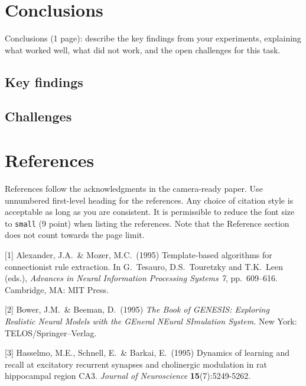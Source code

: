 \documentclass{article}
\begin{document}
\section{Conclusions}
\label{others}
Conclusions (1 page): describe the key findings from your experiments, explaining what worked
well, what did not work, and the open challenges for this task.
\subsection{Key findings}
\subsection{Challenges}


\section*{References}


References follow the acknowledgments in the camera-ready paper. Use unnumbered first-level heading for
the references. Any choice of citation style is acceptable as long as you are
consistent. It is permissible to reduce the font size to \verb+small+ (9 point)
when listing the references.
Note that the Reference section does not count towards the page limit.
\medskip


{
\small


[1] Alexander, J.A.\ \& Mozer, M.C.\ (1995) Template-based algorithms for
connectionist rule extraction. In G.\ Tesauro, D.S.\ Touretzky and T.K.\ Leen
(eds.), {\it Advances in Neural Information Processing Systems 7},
pp.\ 609--616. Cambridge, MA: MIT Press.


[2] Bower, J.M.\ \& Beeman, D.\ (1995) {\it The Book of GENESIS: Exploring
  Realistic Neural Models with the GEneral NEural SImulation System.}  New York:
TELOS/Springer--Verlag.


[3] Hasselmo, M.E., Schnell, E.\ \& Barkai, E.\ (1995) Dynamics of learning and
recall at excitatory recurrent synapses and cholinergic modulation in rat
hippocampal region CA3. {\it Journal of Neuroscience} {\bf 15}(7):5249-5262.
}
\end{document}

